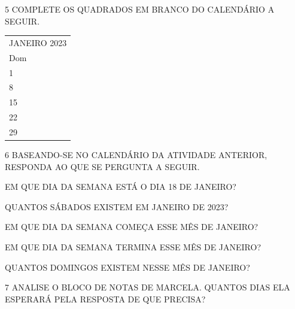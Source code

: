 \num{5} COMPLETE OS QUADRADOS EM BRANCO DO CALENDÁRIO A SEGUIR.

\begin{longtable}[]{@{}l@{}}
\toprule
JANEIRO 2023\tabularnewline
Dom\tabularnewline
1\tabularnewline
8\tabularnewline
15\tabularnewline
22\tabularnewline
29\tabularnewline
\bottomrule
\end{longtable}


\num{6} BASEANDO-SE NO CALENDÁRIO DA ATIVIDADE ANTERIOR, RESPONDA AO QUE SE PERGUNTA A SEGUIR.

\begin{escolha}
\item EM QUE DIA DA SEMANA ESTÁ O DIA 18 DE JANEIRO?


\item QUANTOS SÁBADOS EXISTEM EM JANEIRO DE 2023?


\item EM QUE DIA DA SEMANA COMEÇA ESSE MÊS DE JANEIRO?


\item EM QUE DIA DA SEMANA TERMINA ESSE MÊS DE JANEIRO?


\item QUANTOS DOMINGOS EXISTEM NESSE MÊS DE JANEIRO?

\end{escolha}


\num{7} ANALISE O BLOCO DE NOTAS DE MARCELA. QUANTOS DIAS ELA ESPERARÁ
PELA RESPOSTA DE QUE PRECISA?



